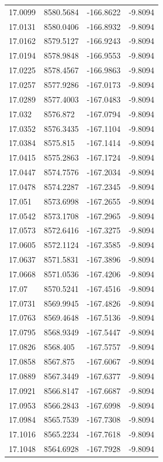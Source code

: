 \begin{table}[H]
\begin{tabular}{llll}
17.0099 & 8580.5684 & -166.8622 & -9.8094 \\
17.0131 & 8580.0406 & -166.8932 & -9.8094 \\
17.0162 & 8579.5127 & -166.9243 & -9.8094 \\
17.0194 & 8578.9848 & -166.9553 & -9.8094 \\
17.0225 & 8578.4567 & -166.9863 & -9.8094 \\
17.0257 & 8577.9286 & -167.0173 & -9.8094 \\
17.0289 & 8577.4003 & -167.0483 & -9.8094 \\
17.032 & 8576.872 & -167.0794 & -9.8094 \\
17.0352 & 8576.3435 & -167.1104 & -9.8094 \\
17.0384 & 8575.815 & -167.1414 & -9.8094 \\
17.0415 & 8575.2863 & -167.1724 & -9.8094 \\
17.0447 & 8574.7576 & -167.2034 & -9.8094 \\
17.0478 & 8574.2287 & -167.2345 & -9.8094 \\
17.051 & 8573.6998 & -167.2655 & -9.8094 \\
17.0542 & 8573.1708 & -167.2965 & -9.8094 \\
17.0573 & 8572.6416 & -167.3275 & -9.8094 \\
17.0605 & 8572.1124 & -167.3585 & -9.8094 \\
17.0637 & 8571.5831 & -167.3896 & -9.8094 \\
17.0668 & 8571.0536 & -167.4206 & -9.8094 \\
17.07 & 8570.5241 & -167.4516 & -9.8094 \\
17.0731 & 8569.9945 & -167.4826 & -9.8094 \\
17.0763 & 8569.4648 & -167.5136 & -9.8094 \\
17.0795 & 8568.9349 & -167.5447 & -9.8094 \\
17.0826 & 8568.405 & -167.5757 & -9.8094 \\
17.0858 & 8567.875 & -167.6067 & -9.8094 \\
17.0889 & 8567.3449 & -167.6377 & -9.8094 \\
17.0921 & 8566.8147 & -167.6687 & -9.8094 \\
17.0953 & 8566.2843 & -167.6998 & -9.8094 \\
17.0984 & 8565.7539 & -167.7308 & -9.8094 \\
17.1016 & 8565.2234 & -167.7618 & -9.8094 \\
17.1048 & 8564.6928 & -167.7928 & -9.8094 \\

\end{tabular}
\end{table}

